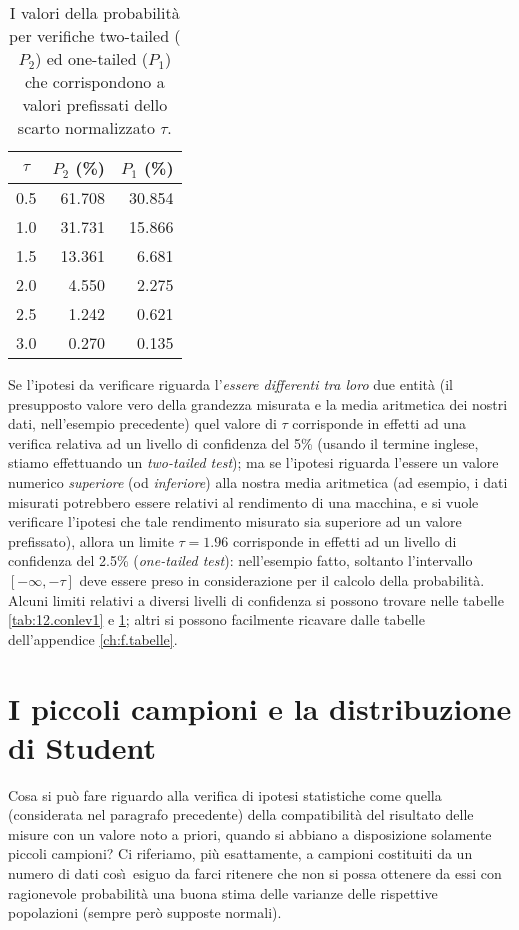 \begin{table}[hbtp]
  \vspace*{2ex}
  \begin{center}
    \begin{tabular}{crr}
      \toprule
      $\tau$ & \multicolumn{1}{c}{$P_2$ (\%)} &
      \multicolumn{1}{c}{$P_1$ (\%)} \\
      \midrule
      0.5 & 61.708 & 30.854 \\
      1.0 & 31.731 & 15.866 \\
      1.5 & 13.361 &  6.681 \\
      2.0 &  4.550 &  2.275 \\
      2.5 &  1.242 &  0.621 \\
      3.0 &  0.270 &  0.135 \\
      \bottomrule
    \end{tabular}
  \end{center}
  \caption{I valori della
    probabilit\`a per verifiche two-tailed ($P_2$) ed
    one-tailed ($P_1$) che corrispondono a valori
    prefissati dello scarto normalizzato $\tau$.}
  \label{tab:12.conlev2}
\end{table}

Se l'ipotesi da verificare riguarda l'\emph{essere
  differenti tra loro} due entit\`a (il presupposto valore
vero della grandezza misurata e la media aritmetica dei
nostri dati, nell'esempio precedente) quel valore di $\tau$
corrisponde in effetti ad una verifica relativa ad un
livello di confidenza del 5\% (usando il termine inglese,
stiamo effettuando un \emph{two-tailed test});%
ma se l'ipotesi riguarda l'essere un valore numerico
\emph{superiore} (od \emph{inferiore}) alla nostra media
aritmetica (ad esempio, i dati misurati potrebbero essere
relativi al rendimento di una macchina, e si vuole
verificare l'ipotesi che tale rendimento misurato sia
superiore ad un valore prefissato), allora un limite $\tau =
1.96$ corrisponde in effetti ad un livello di confidenza del
2.5\% (\emph{one-tailed test}):%
nell'esempio fatto, soltanto l'intervallo $[-\infty, -\tau]$
deve essere preso in considerazione per il calcolo della
probabilit\`a.  Alcuni limiti relativi a diversi livelli di
confidenza si possono trovare nelle tabelle
\ref{tab:12.conlev1} e \ref{tab:12.conlev2}; altri si
possono facilmente ricavare dalle tabelle dell'appendice
\ref{ch:f.tabelle}.%

\section{I piccoli campioni e la distribuzione di
  Student}%
Cosa si pu\`o fare riguardo alla verifica di ipotesi
statistiche come quella (considerata nel paragrafo
precedente) della compatibilit\`a del risultato delle misure
con un valore noto a priori, quando si abbiano a
disposizione solamente piccoli campioni?  Ci riferiamo,
pi\`u esattamente, a campioni costituiti da un numero di
dati cos\`\i\ esiguo da farci ritenere che non si possa
ottenere da essi con ragionevole probabilit\`a una buona
stima delle varianze delle rispettive popolazioni (sempre
per\`o supposte normali).

